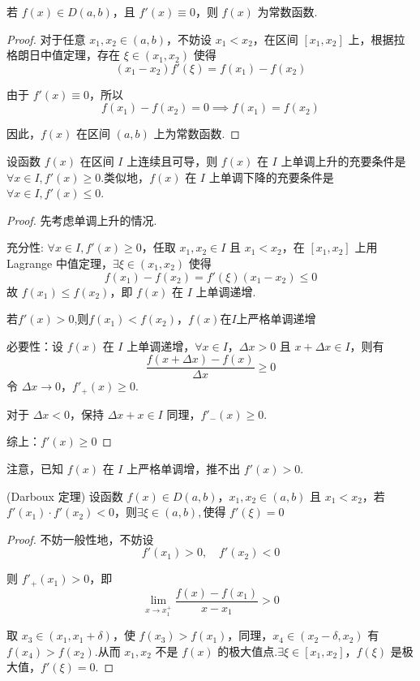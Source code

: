 \begin{corollary}
	若 \( f(x) \in D(a, b) \)，且 \( f'(x) \equiv 0 \)，则 \( f(x) \) 为常数函数.
\end{corollary}
\begin{proof}
	对于任意 \( x_1, x_2 \in (a, b) \)，不妨设 \( x_1 < x_2 \)，在区间 \([x_1, x_2]\) 上，根据拉格朗日中值定理，存在 \( \xi \in (x_1, x_2) \) 使得
	\[
	(x_1 - x_2) f'(\xi) = f(x_1) - f(x_2)
	\]
	
	由于 \( f'(x) \equiv 0 \)，所以
	\[
	f(x_1) - f(x_2) = 0 \implies f(x_1) = f(x_2)
	\]
	
	因此，\( f(x) \) 在区间 \((a, b)\) 上为常数函数.
\end{proof}

\begin{proposition}
	设函数 \( f(x) \) 在区间 \( I \) 上连续且可导，则 \( f(x) \) 在 \( I \) 上单调上升的充要条件是 \( \forall x \in I, f'(x) \geqslant 0 \).类似地，\( f(x) \) 在 \( I \) 上单调下降的充要条件是 \( \forall x \in I, f'(x) \leqslant 0 \).
\end{proposition}
\begin{proof}
	先考虑单调上升的情况.
	
	充分性: \( \forall x \in I, f'(x) \geqslant 0 \)，任取 \( x_1, x_2 \in I \) 且 \( x_1 < x_2 \)，在 \([x_1, x_2]\) 上用 Lagrange 中值定理，\( \exists \xi \in (x_1, x_2) \) 使得
	\[
	f(x_1) - f(x_2) = f'(\xi)(x_1 - x_2) \leqslant 0
	\]
	故 \( f(x_1) \leqslant f(x_2) \)，即 \( f(x) \) 在 \( I \) 上单调递增.
	
	若$f'(x)>0$,则$f(x_1)< f(x_2)$，$f(x)$在$I$上严格单调递增
	
	必要性：设 \( f(x) \) 在 \( I \) 上单调递增，\( \forall x \in I \)，\( \Delta x > 0 \) 且 \( x + \Delta x \in I \)，则有
	\[
	\frac{f(x + \Delta x) - f(x)}{\Delta x} \geqslant 0
	\]
	令 \( \Delta x \to 0 \)，\( f'_+(x) \geqslant 0 \).
	
	对于 \( \Delta x < 0 \)，保持 \( \Delta x + x \in I \) 同理，\( f'_-(x) \geqslant 0 \).
	
	综上：$f'(x)\geqslant 0$
	
	
\end{proof}
注意，已知 \( f(x) \) 在 \( I \) 上严格单调增，推不出 \( f'(x) > 0 \).
\begin{theorem}\label{dabu1}
	(Darboux 定理)
	设函数 \( f(x) \in D(a,b) \)，\( x_1, x_2 \in (a,b) \) 且 \( x_1 < x_2 \)，若 \( f'(x_1) \cdot f'(x_2) < 0 \)，则$\exists \xi \in (a,b), \text{使得 } f'(\xi) = 0$
\end{theorem}
\begin{proof}
	不妨一般性地，不妨设
	\[
	f'(x_1) > 0, \quad f'(x_2) < 0
	\]
	
	则 \( f'_+(x_1) > 0 \)，即
	\[
	\lim_{x \to x_1^+} \frac{f(x) - f(x_1)}{x - x_1} >0
	\]
	
	取 \( x_3 \in (x_1, x_1 + \delta) \)，使 \( f(x_3) > f(x_1) \)，同理，\( x_4 \in (x_2 - \delta, x_2) \) 有 \( f(x_4) > f(x_2) \).从而 \( x_1, x_2 \) 不是 \( f(x) \) 的极大值点.\( \exists \xi \in [x_1, x_2] \)，\( f(\xi) \) 是极大值，\( f'(\xi) = 0 \).
	
\end{proof}
